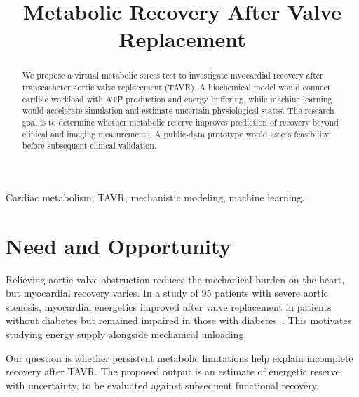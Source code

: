 

\title{Metabolic Recovery After Valve Replacement}
\author{
}
\date{}


\maketitle

\begin{abstract}
We propose a virtual metabolic stress test to investigate myocardial recovery after transcatheter aortic valve replacement (TAVR). A biochemical model would connect cardiac workload with ATP production and energy buffering, while machine learning would accelerate simulation and estimate uncertain physiological states. The research goal is to determine whether metabolic reserve improves prediction of recovery beyond clinical and imaging measurements. A public-data prototype would assess feasibility before subsequent clinical validation.
\end{abstract}

\begin{IEEEkeywords}
Cardiac metabolism, TAVR, mechanistic modeling, machine learning.
\end{IEEEkeywords}

\balance

\section{Need and Opportunity}
Relieving aortic valve obstruction reduces the mechanical burden on the heart, but myocardial recovery varies. In a study of 95 patients with severe aortic stenosis, myocardial energetics improved after valve replacement in patients without diabetes but remained impaired in those with diabetes~\cite{jex2023}. This motivates studying energy supply alongside mechanical unloading.

Our question is whether persistent metabolic limitations help explain incomplete recovery after TAVR. The proposed output is an estimate of energetic reserve with uncertainty, to be evaluated against subsequent functional recovery.


